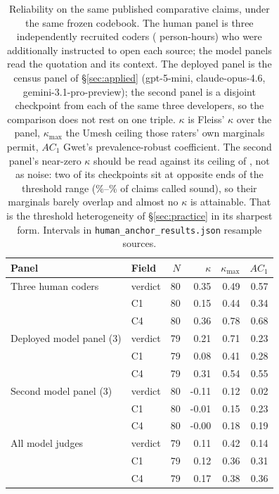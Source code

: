 \begin{table}[t]
\centering\small
\setlength{\tabcolsep}{4pt}
\begin{tabular}{@{}llrrrr@{}}
\toprule
Panel & Field & $N$ & $\kappa$ & $\kappa_{\max}$ & $AC_1$ \\
\midrule
Three human coders & verdict & 80 & 0.35 & 0.49 & 0.57 \\
 & C1 & 80 & 0.15 & 0.44 & 0.34 \\
 & C4 & 80 & 0.36 & 0.78 & 0.68 \\
\addlinespace
Deployed model panel (3) & verdict & 79 & 0.21 & 0.71 & 0.23 \\
 & C1 & 79 & 0.08 & 0.41 & 0.28 \\
 & C4 & 79 & 0.31 & 0.54 & 0.55 \\
\addlinespace
Second model panel (3) & verdict & 80 & -0.11 & 0.12 & 0.02 \\
 & C1 & 80 & -0.01 & 0.15 & 0.23 \\
 & C4 & 80 & -0.00 & 0.18 & 0.19 \\
\addlinespace
All model judges & verdict & 79 & 0.11 & 0.42 & 0.14 \\
 & C1 & 79 & 0.12 & 0.36 & 0.31 \\
 & C4 & 79 & 0.17 & 0.38 & 0.36 \\
\bottomrule
\end{tabular}
\caption{Reliability on the same \HumN{} published comparative claims, under the same frozen codebook. The human panel is three independently recruited coders (\HumHours{} person-hours) who were additionally instructed to open each source; the model panels read the quotation and its context. The deployed panel is the census panel of \S\ref{sec:applied} (gpt-5-mini, claude-opus-4.6, gemini-3.1-pro-preview); the second panel is a disjoint checkpoint from each of the same three developers, so the comparison does not rest on one triple. $\kappa$ is Fleiss' $\kappa$ over the panel, $\kappa_{\max}$ the Umesh ceiling those raters' own marginals permit, $AC_1$ Gwet's prevalence-robust coefficient. The second panel's near-zero $\kappa$ should be read against its ceiling of \HumFrontVerdictKmax{}, not as noise: two of its checkpoints sit at opposite ends of the threshold range (\HumModSpreadLo\%--\HumModSpreadHi\% of claims called sound), so their marginals barely overlap and almost no $\kappa$ is attainable. That is the threshold heterogeneity of \S\ref{sec:practice} in its sharpest form. Intervals in \texttt{human\_anchor\_results.json} resample sources.}
\label{tab:human-anchor}
\end{table}
